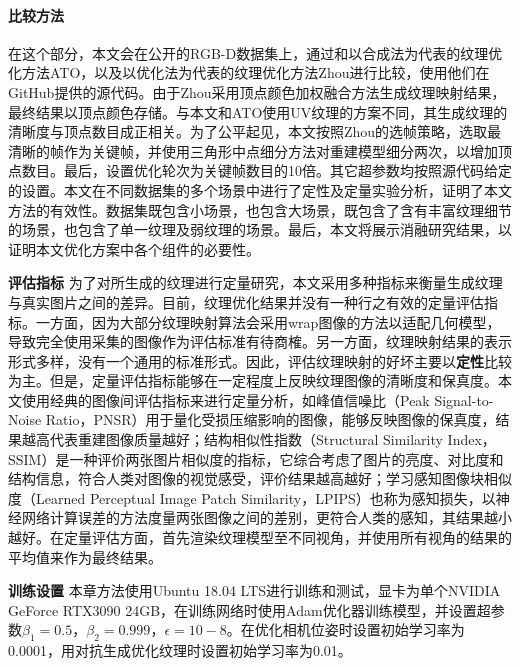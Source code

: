 \paragraph*{\textbf{比较方法}}
在这个部分，本文会在公开的RGB-D数据集上，通过和以合成法为代表的纹理优化方法ATO，以及以优化法为代表的纹理优化方法Zhou进行比较，使用他们在GitHub提供的源代码。由于Zhou采用顶点颜色加权融合方法生成纹理映射结果，最终结果以顶点颜色存储。与本文和ATO使用UV纹理的方案不同，其生成纹理的清晰度与顶点数目成正相关。为了公平起见，本文按照Zhou的选帧策略，选取最清晰的帧作为关键帧，并使用三角形中点细分方法对重建模型细分两次，以增加顶点数目。最后，设置优化轮次为关键帧数目的10倍。其它超参数均按照源代码给定的设置。本文在不同数据集的多个场景中进行了定性及定量实验分析，证明了本文方法的有效性。数据集既包含小场景，也包含大场景，既包含了含有丰富纹理细节的场景，也包含了单一纹理及弱纹理的场景。最后，本文将展示消融研究结果，以证明本文优化方案中各个组件的必要性。\par
\noindent\textbf{评估指标}\quad
为了对所生成的纹理进行定量研究，本文采用多种指标来衡量生成纹理与真实图片之间的差异。目前，纹理优化结果并没有一种行之有效的定量评估指标。一方面，因为大部分纹理映射算法会采用wrap图像的方法以适配几何模型，导致完全使用采集的图像作为评估标准有待商榷。另一方面，纹理映射结果的表示形式多样，没有一个通用的标准形式。因此，评估纹理映射的好坏主要以\textbf{定性}比较为主。但是，定量评估指标能够在一定程度上反映纹理图像的清晰度和保真度。本文使用经典的图像间评估指标来进行定量分析，如峰值信噪比（Peak Signal-to-Noise Ratio，PNSR）用于量化受损压缩影响的图像，能够反映图像的保真度，结果越高代表重建图像质量越好；结构相似性指数（Structural Similarity Index，SSIM）是一种评价两张图片相似度的指标，它综合考虑了图片的亮度、对比度和结构信息，符合人类对图像的视觉感受，评价结果越高越好；学习感知图像块相似度（Learned Perceptual Image Patch Similarity，LPIPS）也称为感知损失，以神经网络计算误差的方法度量两张图像之间的差别，更符合人类的感知，其结果越小越好。在定量评估方面，首先渲染纹理模型至不同视角，并使用所有视角的结果的平均值来作为最终结果。


\noindent\textbf{训练设置}\quad
本章方法使用Ubuntu 18.04 LTS进行训练和测试，显卡为单个NVIDIA GeForce RTX3090 24GB，在训练网络时使用Adam优化器训练模型，并设置超参数$\beta_1=0.5，\beta_2=0.999，\epsilon =10-8$。在优化相机位姿时设置初始学习率为0.0001，用对抗生成优化纹理时设置初始学习率为0.01。

